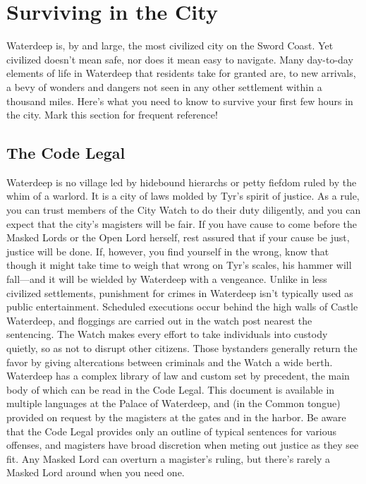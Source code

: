 \documentclass[10pt,a4paper,twoside,twocolumn,openany,nodeprecatedcode]{dndbook}
\begin{document}
\section{Surviving in the City}
Waterdeep is, by and large, the most civilized city on the Sword Coast. Yet civilized doesn't mean safe, nor does it mean easy to navigate. Many day-to-day elements of life in Waterdeep that residents take for granted are, to new arrivals, a bevy of wonders and dangers not seen in any other settlement within a thousand miles. Here's what you need to know to survive your first few hours in the city. Mark this section for frequent reference!
\subsection{The Code Legal}
Waterdeep is no village led by hidebound hierarchs or petty fiefdom ruled by the whim of a warlord. It is a city of laws molded by Tyr's spirit of justice. As a rule, you can trust members of the City Watch to do their duty diligently, and you can expect that the city's magisters will be fair. If you have cause to come before the Masked Lords or the Open Lord herself, rest assured that if your cause be just, justice will be done. If, however, you find yourself in the wrong, know that though it might take time to weigh that wrong on Tyr's scales, his hammer will fall—and it will be wielded by Waterdeep with a vengeance.
Unlike in less civilized settlements, punishment for crimes in Waterdeep isn't typically used as public entertainment. Scheduled executions occur behind the high walls of Castle Waterdeep, and floggings are carried out in the watch post nearest the sentencing. The Watch makes every effort to take individuals into custody quietly, so as not to disrupt other citizens. Those bystanders generally return the favor by giving altercations between criminals and the Watch a wide berth.
Waterdeep has a complex library of law and custom set by precedent, the main body of which can be read in the Code Legal. This document is available in multiple languages at the Palace of Waterdeep, and (in the Common tongue) provided on request by the magisters at the gates and in the harbor. Be aware that the Code Legal provides only an outline of typical sentences for various offenses, and magisters have broad discretion when meting out justice as they see fit. Any Masked Lord can overturn a magister's ruling, but there's rarely a Masked Lord around when you need one.
\end{document}
